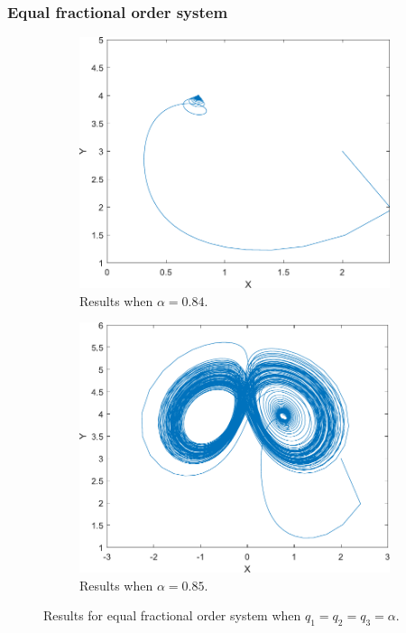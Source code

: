 \subsubsection{Equal fractional order system}
\begin{figure}[H]
  \centering
  \begin{subfigure}[H]{0.4\textwidth}
    \includegraphics[scale = 0.5]{files/a084.pdf}
    \centering
    \caption{Results when $\alpha=0.84$.}
    \label{fig:2a}
  \end{subfigure}
  \hspace{1cm}
  \begin{subfigure}[H]{0.4\textwidth}
    \includegraphics[scale = 0.5]{files/b085.pdf}
    \centering
    \caption{Results when $\alpha=0.85$.}
    \label{fig:2b}
  \end{subfigure}
  \caption{Results for equal fractional order system when $q_1=q_2=q_3=\alpha$.}
  \label{img:equalalpha}
\end{figure}


